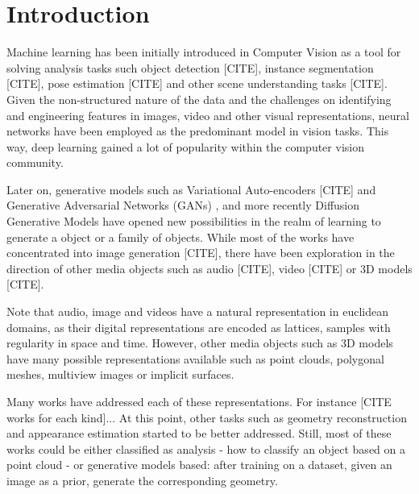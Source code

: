 \chapter{Introduction}


Machine learning has been initially introduced in Computer Vision as a tool for solving analysis tasks such object detection [CITE], instance segmentation [CITE], pose estimation [CITE] and other scene understanding tasks [CITE]. Given the non-structured nature of the data and the challenges on identifying and engineering features in images, video and other visual representations, neural networks have been employed as the predominant model in vision tasks. This way, deep learning gained a lot of popularity within the computer vision community.

Later on, generative models such as Variational Auto-encoders [CITE] and Generative Adversarial Networks (GANs) \cite{goodfellow2014generative}, and more recently Diffusion Generative Models \cite{ho2020denoising} have opened new possibilities in the realm of learning to generate a object or a family of objects. While most of the works have concentrated into image generation [CITE], there have been exploration in the direction of other media objects such as audio [CITE], video [CITE] or 3D models [CITE].


Note that audio, image and videos have a natural representation in euclidean domains, as their digital representations are encoded as lattices, samples with regularity in space and time. However, other media objects such as 3D models have many possible representations available such as point clouds, polygonal meshes, multiview images or implicit surfaces.



Many works have addressed each of these representations. For instance [CITE works for each kind]... At this point, other tasks such as geometry reconstruction and appearance estimation started to be better addressed. Still, most of these works could be either classified as analysis - how to classify an object based on a point cloud - or generative models based: after training on a dataset, given an image as a prior, generate the corresponding geometry.

